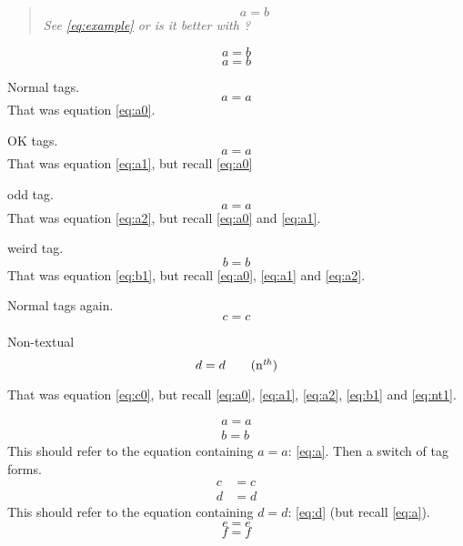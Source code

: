 \documentclass{article}
\begin{document}
\begin{quote}\renewcommand*\rmdefault{ppl}\normalfont\itshape
\begin{equation*}
a=b \label{eq:example}\tag*{Q\&A}
\end{equation*}
See \ref{eq:example} or is it better with ?
\end{quote}

\begin{equation*}
a=b \label{eq:example2}\tag*{Q\&A}
\end{equation*}
\begin{equation*}
a=b \label{eq:example3}\tag{Q\&A}
\end{equation*}

Normal tags.
\begin{equation}
a=a\label{eq:a0}
\end{equation}
That was equation \eqref{eq:a0}.

OK tags.
\begin{equation}
a=a\label{eq:a1}
\end{equation}
That was equation \eqref{eq:a1}, but recall \eqref{eq:a0}

odd tag.
\begin{equation}
a=a\label{eq:a2}
\end{equation}
That was equation \eqref{eq:a2}, but recall \eqref{eq:a0} and \eqref{eq:a1}.

weird tag.
\begin{equation}
b=b\label{eq:b1}
\end{equation}
That was equation \eqref{eq:b1}, but recall \eqref{eq:a0}, \eqref{eq:a1} and \eqref{eq:a2}.

Normal tags again.
\begin{equation}
c=c\label{eq:c0}
\end{equation}

Non-textual
\begin{equation}
d=d \label{eq:nt1}\tag{n$^{\mathit{th}}$}
\end{equation}

That was equation \eqref{eq:c0}, but recall \eqref{eq:a0}, \eqref{eq:a1}, \eqref{eq:a2},
\eqref{eq:b1} and \eqref{eq:nt1}.


\begin{gather}
a=a \label{eq:a} \\
b=b \label{eq:b} \tag{**}
\end{gather}
This should refer to the equation containing $a=a$: \eqref{eq:a}.
Then a switch of tag forms.
\begin{align}
c&=c \label{eq:c} \\
d&=d \label{eq:d}
\end{align}
This should refer to the equation containing $d=d$: \eqref{eq:d}
(but recall \eqref{eq:a}).
\begin{equation}
e=e
\end{equation}
\begin{equation}
f=f
\end{equation}
\end{document}

